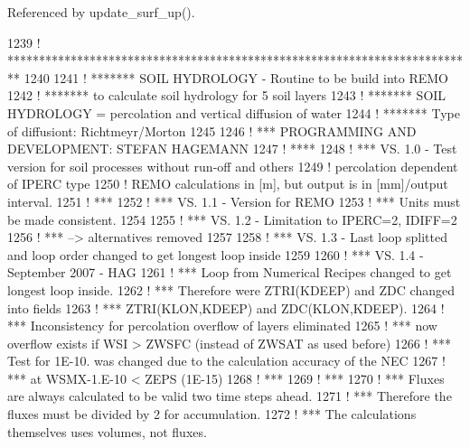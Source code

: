 Referenced by update\+\_\+surf\+\_\+up().


\begin{DoxyCode}
1239 \textcolor{comment}{!     **************************************************************************}
1240 
1241 \textcolor{comment}{!     ******* SOIL HYDROLOGY - Routine to be build into REMO}
1242 \textcolor{comment}{!     *******   to calculate soil hydrology for 5 soil layers}
1243 \textcolor{comment}{!     ******* SOIL HYDROLOGY = percolation and vertical diffusion of water}
1244 \textcolor{comment}{!     ******* Type of diffusiont:  Richtmeyr/Morton}
1245 
1246 \textcolor{comment}{!     *** PROGRAMMING AND DEVELOPMENT: STEFAN HAGEMANN}
1247 \textcolor{comment}{!     ****}
1248 \textcolor{comment}{!     *** VS. 1.0 - Test version for soil processes without run-off and others}
1249 \textcolor{comment}{!              percolation dependent of IPERC type}
1250 \textcolor{comment}{!              REMO calculations in [m], but output is in [mm]/output interval.}
1251 \textcolor{comment}{!     ***}
1252 \textcolor{comment}{!     *** VS. 1.1 - Version for REMO}
1253 \textcolor{comment}{!     ***           Units must be made consistent.}
1254 
1255 \textcolor{comment}{!     *** VS. 1.2 - Limitation to IPERC=2, IDIFF=2}
1256 \textcolor{comment}{!     ***           --> alternatives removed}
1257 
1258 \textcolor{comment}{!     *** VS. 1.3 - Last loop splitted and loop order changed to get longest loop inside}
1259 
1260 \textcolor{comment}{!     *** VS. 1.4 - September 2007 - HAG}
1261 \textcolor{comment}{!     ***           Loop from Numerical Recipes changed to get longest loop inside.}
1262 \textcolor{comment}{!     ***               Therefore were ZTRI(KDEEP) and ZDC changed into fields}
1263 \textcolor{comment}{!     ***               ZTRI(KLON,KDEEP) and ZDC(KLON,KDEEP).}
1264 \textcolor{comment}{!     ***           Inconsistency for percolation overflow of layers eliminated}
1265 \textcolor{comment}{!     ***               now overflow exists if WSI > ZWSFC (instead of ZWSAT as used before)}
1266 \textcolor{comment}{!     ***           Test for 1E-10. was changed due to the calculation accuracy of the NEC}
1267 \textcolor{comment}{!     ***               at WSMX-1.E-10 < ZEPS (1E-15)}
1268 \textcolor{comment}{!     ***}
1269 \textcolor{comment}{!     ***}
1270 \textcolor{comment}{!     *** Fluxes are always calculated to be valid two time steps ahead.}
1271 \textcolor{comment}{!     *** Therefore the fluxes must be divided by 2 for accumulation.}
1272 \textcolor{comment}{!     *** The calculations themselves uses volumes, not fluxes.}

\end{DoxyCode}
